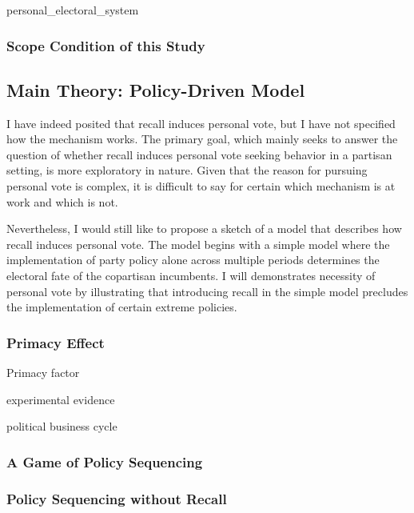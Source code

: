 \documentclass[hyphens, crop=false]{standalone}
\begin{document}
			{personal_electoral_system}
		
		\subsubsection*{Scope Condition of this Study}
		
	\subsection*{Main Theory: Policy-Driven Model}
		
		I have indeed posited that recall induces personal vote,
		but I have not specified how the mechanism works.
		The primary goal,
		which mainly seeks to answer the question of whether
		recall induces personal vote seeking behavior in a partisan setting,
		is more exploratory in nature.
		Given that the reason for pursuing personal vote is complex,
		it is difficult to say for certain which mechanism is at work
		and which is not.
		
		Nevertheless, I would still like to propose a sketch of a model
		that describes how recall induces personal vote.
		The model begins with a simple model where
		the implementation of party policy alone across multiple periods
		determines the electoral fate of the copartisan incumbents.
		I will demonstrates necessity of personal vote
		by illustrating that introducing recall in the simple model
		precludes the implementation of certain extreme policies.
		
		
		
		\subsubsection*{Primacy Effect}
		
		Primacy factor
		
		experimental evidence
		
		political business cycle
		
	
		\subsubsection*{A Game of Policy Sequencing}
		
		\subsubsection*{Policy Sequencing without Recall}
		
\end{document}
